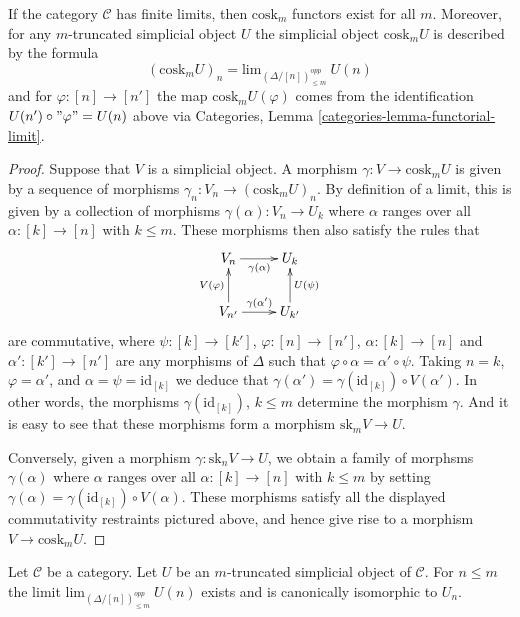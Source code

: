 \begin{lemma}
\label{lemma-existence-cosk}
If the category $\mathcal{C}$ has finite limits, then
$\text{cosk}_m$ functors exist for all $m$. Moreover,
for any $m$-truncated simplicial object $U$ the
simplicial object $\text{cosk}_mU$ is described
by the formula
$$
(\text{cosk}_mU)_n = \text{lim}_{(\Delta/[n])_{\leq m}^{opp}}\ U(n)
$$
and for $\varphi : [n] \to [n']$ the map
$\text{cosk}_mU(\varphi)$ comes from the
identification $U(n') \circ "\varphi" = U(n)$ above 
via Categories, Lemma \ref{categories-lemma-functorial-limit}.
\end{lemma}

\begin{proof}
Suppose that $V$ is a simplicial object.
A morphism $\gamma : V \to \text{cosk}_mU$ is given by a sequence
of morphisms $\gamma_n : V_n \to (\text{cosk}_mU)_n$.
By definition of a limit, this is given by a
collection of morphisms $\gamma(\alpha) : V_n \to U_k$
where $\alpha$ ranges over all $\alpha : [k] \to [n]$
with $k \leq m$. These morphisms then also satisfy
the rules that
$$
\xymatrix{
V_n \ar[r]_{\gamma(\alpha)} &  U_k \\
V_{n'} \ar[r]^{\gamma(\alpha')} \ar[u]^{V(\varphi)} & U_{k'} \ar[u]_{U(\psi)}
}
$$
are commutative, where $\psi : [k] \to [k']$,
$\varphi : [n] \to [n']$, $\alpha : [k] \to [n]$ and
$\alpha' : [k'] \to [n']$ are any morphisms of $\Delta$
such that $\varphi \circ \alpha = \alpha' \circ \psi$.
Taking $n = k$, $\varphi = \alpha'$, and $\alpha = \psi = \text{id}_{[k]}$
we deduce that $\gamma(\alpha') = \gamma(\text{id}_{[k]}) \circ V(\alpha')$.
In other words, the morphisms $\gamma(\text{id}_{[k]})$, $k \leq m$
determine the morphism $\gamma$. And it is easy to see that these
morphisms form a morphism $\text{sk}_m V \to U$.

\medskip\noindent
Conversely, given a morphism $\gamma : \text{sk}_n V \to U$, 
we obtain a family of morphsms $\gamma(\alpha)$
where $\alpha$ ranges over all $\alpha : [k] \to [n]$
with $k \leq m$ by setting $\gamma(\alpha) = 
\gamma(\text{id}_{[k]}) \circ V(\alpha)$. These morphisms
satisfy all the displayed commutativity restraints pictured
above, and hence give rise to a morphism $V \to \text{cosk}_m U$.
\end{proof}

\begin{lemma}
\label{lemma-trivial-cosk}
Let $\mathcal{C}$ be a category.
Let $U$ be an $m$-truncated simplicial object of $\mathcal{C}$.
For $n \leq m$ the limit $\text{lim}_{(\Delta/[n])_{\leq m}^{opp}}\ U(n)$
exists and is canonically isomorphic to $U_n$.
\end{lemma}

